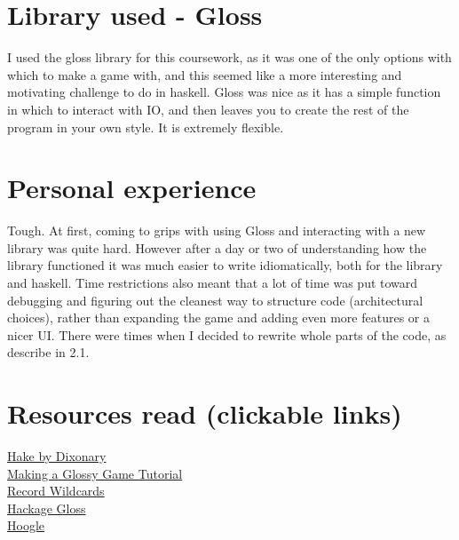\documentclass[12pt,a4paper]{article}
\begin{document}
\section{Library used - Gloss}
I used the gloss library for this coursework, as it was one of the only options with which to make a game with, and this seemed like a more interesting and motivating challenge to do in haskell. Gloss was nice as it has a simple function in which to interact with IO, and then leaves you to create the rest of the program in your own style. It is extremely flexible.
\section{Personal experience}
Tough. At first, coming to grips with using Gloss and interacting with a new library was quite hard. However after a day or two of understanding how the library functioned it was much easier to write idiomatically, both for the library and haskell. Time restrictions also meant that a lot of time was put toward debugging and figuring out the cleanest way to structure code (architectural choices), rather than expanding the game and adding even more features or a nicer UI. There were times when I decided to rewrite whole parts of the code, as describe in 2.1.
\section{Resources read (clickable links)}
\href{https://github.com/dixonary/hake}{Hake by Dixonary}\\
\href{https://mmhaskell.com/blog/2019/3/25/making-a-glossy-game-part-1}{Making a Glossy Game Tutorial}\\
\href{https://blog.ocharles.org.uk/blog/posts/2014-12-04-record-wildcards.html}{Record Wildcards}\\
\href{https://hackage.haskell.org/package/gloss}{Hackage Gloss}\\
\href{https://hoogle.haskell.org/}{Hoogle}\\
\end{document}
